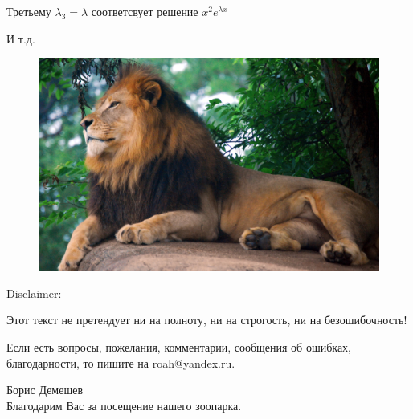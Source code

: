 \documentclass[10pt,a4paper]{article}
\begin{document}
\par Третьему $\lambda_3 = \lambda$ соответсвует решение $x^2e^{\lambda x}$
\par И т.д.
\newpage
\pagecolor{YellowOrange}
\begin{figure}[h]
\centerline{\includegraphics[width = 12cm]{king.jpg}}
\end{figure}
\par Disclaimer:
\par Этот текст не претендует ни на полноту, ни на строгость, ни на безошибочность! 
\par Если есть вопросы, пожелания, комментарии, сообщения об ошибках, благодарности, то пишите на roah@yandex.ru. 
\par Борис Демешев \\

Благодарим Вас за посещение нашего зоопарка.
\end{document}
